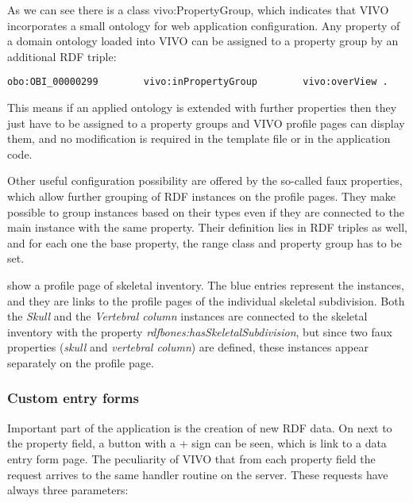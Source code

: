 As we can see there is a class vivo:PropertyGroup, which indicates that VIVO incorporates a small ontology for web application configuration. Any property of a domain ontology loaded into VIVO can be assigned to a property group by an additional RDF triple:

\begin{lstlisting}[captionpos=b, caption=Assigning property to propery group, label=jsListing, belowskip=1em, aboveskip=2em,
basicstyle=\footnotesize,frame=single]
obo:OBI_00000299		vivo:inPropertyGroup 		vivo:overView .
\end{lstlisting}


This means if an applied ontology is extended with further properties then they just have to be assigned to a property groups and VIVO profile pages can display them, and no modification is required in the template file or in the application code.

Other useful configuration possibility are offered by the so-called faux properties, which allow further grouping of RDF instances on the profile pages. They make possible to group instances based on their types even if they are connected to the main instance with the same property. Their definition lies in RDF triples as well, and for each one the base property, the range class and property group has to be set.



 show a profile page of skeletal inventory. The blue entries represent the instances, and they are links to the profile pages of the individual skeletal subdivision. Both the \textit{Skull} and the \textit{Vertebral column} instances are connected to the skeletal inventory with the property \textit{rdfbones:hasSkeletalSubdivision}, but since two faux properties (\textit{skull} and \textit{vertebral column}) are defined, these instances appear separately on the profile page.


\subsubsection{Custom entry forms} \label{vivoCef}

Important part of the application is the creation of new RDF data. On  next to the property field, a button with a + sign can be seen, which is link to a data entry form page. The peculiarity of VIVO that from each property field the request arrives to the same handler routine on the server. These requests have always three parameters:

